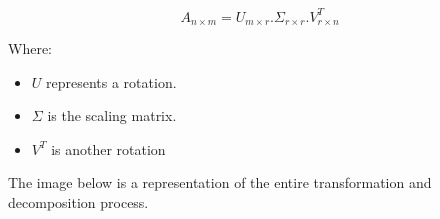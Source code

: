 \documentclass[a4,12pt,twosided,openany]{memoir}
\begin{document}
\begin{equation} \label{eq:tSVD}
A_{n \times m} = U_{m \times r}.\Sigma_{r \times r}.V^{T}_{r \times n}
\end{equation}
\par 
\indent
Where:
\par 
\indent
\begin{tcolorbox}
\begin{itemize}
\item $U$ represents a rotation.
\item $\Sigma$ is the scaling matrix.
\item $V^{T}$ is another rotation 
\end{itemize}
\end{tcolorbox}
\par 
\indent
The image below is a representation of the entire transformation and decomposition process.
\end{document}
